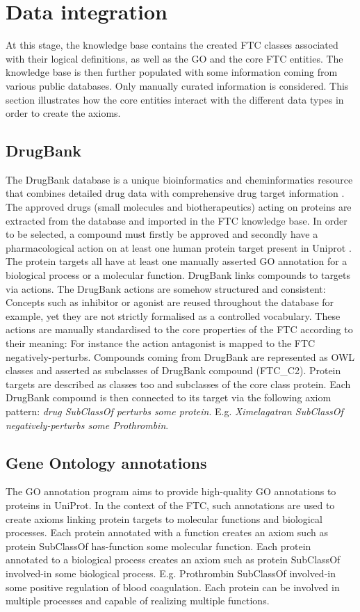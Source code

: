 \documentclass{bioinfo}
\begin{document}
\section{Data integration}
At this stage, the knowledge base contains the created FTC classes associated with their 
logical definitions, as well as the GO and the core FTC entities. The knowledge base is then 
further populated with some information coming from various public databases. Only manually curated 
information is considered. This section illustrates how the core entities interact with the different data types 
in order to create the axioms.

\subsection{DrugBank}
The DrugBank database is a unique bioinformatics and cheminformatics resource 
that combines detailed drug data with comprehensive drug target information \citep{Knox2011}. The approved 
drugs (small molecules and biotherapeutics) acting on proteins are extracted from the database and 
imported in the FTC knowledge base. In order to be selected, a compound must firstly be approved and 
secondly have a pharmacological action on at least one human protein target present in Uniprot \citep{TheUniprotConsortium2013}. 
The protein targets all have at least one manually asserted GO annotation \citep{Dimmer2012} for a biological process or a 
molecular function. DrugBank links compounds to targets via actions. The DrugBank actions are somehow 
structured and consistent: Concepts such as inhibitor or agonist are reused throughout the database for 
example, yet they are not strictly formalised as a controlled vocabulary. These actions are manually 
standardised to the core properties of the FTC according to their meaning: For instance the action 
antagonist is mapped to the FTC negatively-perturbs.
Compounds coming from DrugBank are represented as OWL classes and asserted 
as subclasses of DrugBank compound (FTC\_C2). Protein targets are described as classes 
too and subclasses of the core class protein. Each DrugBank compound is then connected to 
its target via the following axiom pattern: \emph{drug SubClassOf perturbs some protein}. 
E.g. \emph{Ximelagatran SubClassOf negatively-perturbs some Prothrombin}.

\subsection{Gene Ontology annotations}
The GO annotation program aims to provide high-quality GO annotations to 
proteins in UniProt. In the context of the FTC, such annotations are used 
to create axioms linking protein targets to molecular functions and biological processes. 
Each protein annotated with a function creates an axiom such 
as protein SubClassOf has-function some molecular function. 
Each protein annotated to a biological process creates an axiom such 
as protein SubClassOf involved-in some biological process. 
E.g. Prothrombin SubClassOf involved-in some positive regulation of blood coagulation. 
Each protein can be involved in multiple processes and capable of realizing multiple functions.
\end{document}

